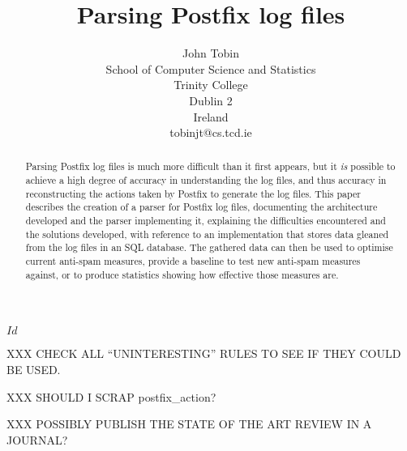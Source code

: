 \documentclass[a4paper,12pt,draft]{report}
\begin{document}
\title{Parsing Postfix log files}
\author{John Tobin \\ School of Computer Science and Statistics \\
Trinity College \\ Dublin 2 \\ Ireland \\ tobinjt@cs.tcd.ie}
\maketitle

\begin{abstract}


    Parsing Postfix log files is much more difficult than it first appears,
    but it \textit{is\/} possible to achieve a high degree of accuracy in
    understanding the log files, and thus accuracy in reconstructing the
    actions taken by Postfix to generate the log files.  This paper
    describes the creation of a parser for Postfix log files, documenting
    the architecture developed and the parser implementing it, explaining
    the difficulties encountered and the solutions developed, with
    reference to an implementation that stores data gleaned from the log
    files in an SQL database.  The gathered data can then be used to
    optimise current anti-spam measures, provide a baseline to test new
    anti-spam measures against, or to produce statistics showing how
    effective those measures are.

\end{abstract}

\SVN$Id$
\begin{center}
    \SVNId{}
\end{center}

XXX CHECK ALL ``UNINTERESTING'' RULES TO SEE IF THEY COULD BE USED\@.

XXX SHOULD I SCRAP postfix\_action?

XXX POSSIBLY PUBLISH THE STATE OF THE ART REVIEW IN A JOURNAL\@?

\newpage
\tableofcontents
\listoffigures
\listoftables

\newpage




\glsaddall[types={postfix}]











\appendix




\renewcommand{\glossarypostamble}{\label{Glossary}}
\printglossary[style=nospacelist]{}
\renewcommand{\glossarypostamble}{\label{Acronyms}}
\printglossary[type=\acronymtype,style=eqlist]{}
\renewcommand{\glossarypostamble}{\label{Postfix Daemons}}
\printglossary[type=postfix,style=nospacelist]{}
\end{document}
